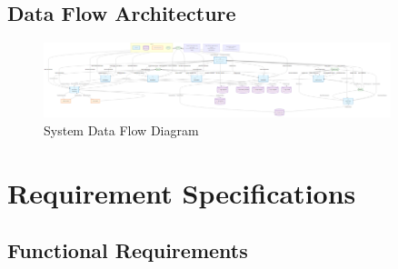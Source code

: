 \documentclass[12pt,a4paper]{article}
\begin{document}
\subsection{Data Flow Architecture}

\begin{figure}[H]
\centering
\includegraphics[width=0.9\textwidth]{diagrams/data_flow_diagram.png}
\caption{System Data Flow Diagram}
\label{fig:data-flow-diagram}
\end{figure}

\section{Requirement Specifications}

\subsection{Functional Requirements}
\end{document}

